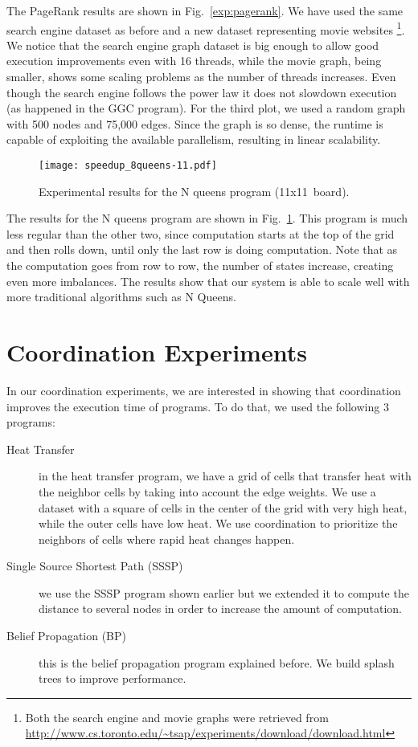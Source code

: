 The PageRank results are shown in Fig.~\ref{exp:pagerank}. We have used the same search engine dataset as before and a new dataset representing movie websites \footnote{Both the search engine and movie graphs were retrieved from \url{http://www.cs.toronto.edu/~tsap/experiments/download/download.html}}. We notice that the search engine graph dataset is big enough to allow good execution improvements even with 16 threads, while the movie graph, being smaller, shows some scaling problems as the number of threads increases. Even though the search engine follows the power law it does not slowdown execution (as happened in the GGC program).
For the third plot, we used a random graph with 500 nodes and 75,000 edges. Since the graph is so dense, the runtime is capable of exploiting the
available parallelism, resulting in linear scalability.

\begin{figure}[h!]
     \centering
    \texttt{[image: speedup\_8queens-11.pdf]}
    \caption{Experimental results for the N queens program (11x11~board).}
    \label{exp:8queens}
\end{figure}

The results for the N queens program are shown in Fig.~\ref{exp:8queens}. This program is much less regular than the other two, since computation starts at the top of the grid and then rolls down, until only the last row is doing computation. Note that as the computation goes from row to row, the number of states increase, creating even more imbalances. The results show that our system is able to scale well with more traditional algorithms such as N Queens.

\section{Coordination Experiments}

In our coordination experiments, we are interested in showing that coordination improves the execution time of programs.
To do that, we used the following 3 programs:

\begin{description}
   \item[Heat Transfer] in the heat transfer program, we have a grid of cells that transfer heat with the neighbor cells by taking into account the edge weights. We use a dataset with a square of cells in the center of the grid with very high heat, while the outer cells have low heat. We use coordination to prioritize the neighbors of cells where rapid heat changes happen.
   \item[Single Source Shortest Path (SSSP)] we use the SSSP program shown earlier but we extended it to compute the distance to several nodes in order to increase the amount of computation.
   \item[Belief Propagation (BP)] this is the belief propagation program explained before. We build splash trees to improve performance.
\end{description}

